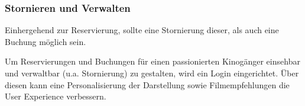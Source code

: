 \subsubsection*{Stornieren und Verwalten}
\label{ssssec:stornieren_und_verwalten}
Einhergehend zur Reservierung, sollte eine Stornierung dieser, als auch eine Buchung möglich sein.

Um Reservierungen und Buchungen für einen passionierten Kinogänger einsehbar und verwaltbar (u.a. Stornierung) zu gestalten, wird ein Login eingerichtet.
Über diesen kann eine Personalisierung der Darstellung sowie Filmempfehlungen die User Experience verbessern.


